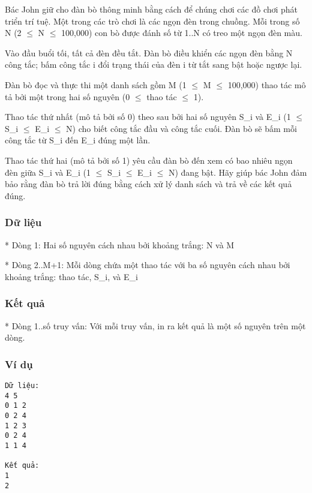 



   Bác John giữ cho đàn bò thông minh bằng cách để chúng chơi các đồ chơi phát triển trí tuệ. Một trong các trò chơi là các ngọn đèn trong chuồng. Mỗi trong số N (2  $\le$  N  $\le$  100,000) con bò được đánh số từ 1..N có treo một ngọn đèn màu.  

   Vào đầu buổi tối, tất cả đèn đều tắt. Đàn bò điều khiển các ngọn đèn bằng N công tắc; bấm công tắc i đổi trạng thái của đèn i từ tắt sang bật hoặc ngược lại.  

   Đàn bò đọc và thực thi một danh sách gồm M (1  $\le$  M  $\le$  100,000) thao tác mô tả bởi một trong hai số nguyên (0  $\le$  thao tác  $\le$  1).  

   Thao tác thứ nhất (mô tả bởi số 0) theo sau bởi hai số nguyên S\_i và E\_i (1  $\le$  S\_i  $\le$  E\_i  $\le$  N) cho biết công tắc đầu và công tắc cuối. Đàn bò sẽ bấm mỗi công tắc từ S\_i đến E\_i đúng một lần.  

   Thao tác thứ hai (mô tả bởi số 1) yêu cầu đàn bò đến xem có bao nhiêu ngọn đèn giữa S\_i và E\_i (1  $\le$  S\_i  $\le$  E\_i  $\le$  N) đang bật. Hãy giúp bác John đảm bảo rằng đàn bò trả lời đúng bằng cách xử lý danh sách và trả về các kết quả đúng.  

\subsubsection{   Dữ liệu  }

   * Dòng 1: Hai số nguyên cách nhau bởi khoảng trắng: N và M  

   * Dòng 2..M+1: Mỗi dòng chứa một thao tác với ba số nguyên cách nhau bởi khoảng trắng: thao tác, S\_i, và E\_i  

\subsubsection{   Kết quả  }

   * Dòng 1..số truy vấn: Với mỗi truy vấn, in ra kết quả là một số nguyên trên một dòng.  

\subsubsection{   Ví dụ  }
\begin{verbatim}
Dữ liệu:
4 5
0 1 2
0 2 4
1 2 3
0 2 4
1 1 4

Kết quả:
1
2
\end{verbatim}
